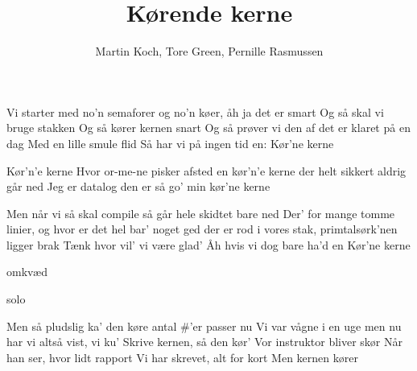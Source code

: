 \documentclass[10pt]{article}
\title{Kørende kerne}
\author{Martin Koch, Tore Green, Pernille Rasmussen}
\begin{document}
\twocolumn[ %
\maketitle

]
\begin{song}
 Vi starter med no'n semaforer
og no'n køer, åh ja det er smart
Og så skal vi bruge stakken
Og så kører kernen snart
Og så prøver vi den af
det er klaret på en dag
Med en lille smule flid
Så har vi på ingen tid
en: Kør'ne kerne


 Kør'n'e kerne
Hvor or-me-ne pisker afsted
en kør'n'e kerne
der helt sikkert aldrig går ned
Jeg er datalog
den er så go'
min kør'ne kerne

Men når vi så skal compile
så går hele skidtet bare ned
Der' for mange tomme linier,
og hvor er det hel bar' noget ged
der er rod i vores stak,
primtalsørk'nen ligger brak
Tænk hvor vil' vi være glad'
Åh hvis vi dog bare ha'd 
en Kør'ne kerne\par


\scene omkvæd

\scene solo

\pagebreak

Men så pludslig ka' den køre
antal \#'er passer nu
Vi var vågne i en uge
men nu har vi altså vist, vi ku'
Skrive kernen, så den kør'
Vor instruktor bliver skør
Når han ser, hvor lidt rapport
Vi har skrevet, alt for kort
Men kernen kører
\end{song}
\end{document}
